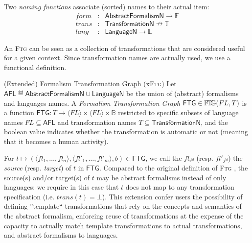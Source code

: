 \begin{Definition}
   Two \emph{naming functions} associate (sorted) names to their actual item:
   \begin{displaymath}
      \begin{array}{rcl}
         form  &\colon& \mathsf{AbstractFormalismN} \to \mathbb{F}\\
         trans &\colon& \mathsf{TransformationN} \nrightarrow \mathbb{T}\\
         lang  &\colon& \mathsf{LanguageN} \to \mathbb{L}
      \end{array}
   \end{displaymath}
\end{Definition}

An \textsc{Ftg} can be seen as a collection of transformations that are 
considered useful for a given context. Since transformation names are actually 
used, we use a functional definition.
\begin{Definition}{(Extended) Formalism Transformation Graph (x\textsc{Ftg})}
   Let $\mathsf{AFL} \eqdef \mathsf{AbstractFormalismN} \cup 
\mathsf{LanguageN}$ be the union of (abstract) formalisms and languages names. A 
\emph{Formalism Transformation Graph} $\mathsf{FTG} \in \mathbb{F}\!\mathbb{T}\!\mathbb{G}(FL, T)$ is a 
function  $\mathsf{FTG} \colon T \to \langle FL \rangle \times \langle FL 
\rangle \times \mathbb{B}$ restricted to specific subsets of language names $FL 
\subseteq \mathsf{AFL}$ and transformation names $T\subseteq 
\mathsf{TransformationN}$, and the boolean value indicates whether the 
transformation is automatic or not (meaning that it becomes a human activity).
\end{Definition}
\noindent
For $t \mapsto (\langle fl_1, \ldots, fl_n \rangle, \langle fl'_1, \ldots, 
fl'_m \rangle, b)\in \mathsf{FTG}$, we call the $fl_i$s (resp. $fl'_j$s) the 
\emph{source} (resp. \emph{target}) of $t$ in $\mathsf{FTG}$. 
Compared to the original definition of \textsc{Ftg} 
\cite{Mustafiz-etAl:2012,TR:Lucio-Mustafiz-etAl:2012}, the source(s) and/or 
target(s) of $t$ may be abstract formalisms instead of only languages: we 
require in this case that $t$ does not map to any transformation specification 
(i.e. $trans(t) = \bot$). This extension confer users the possibility of 
defining ''template`` transformations that rely on the concepts and semantics 
of the abstract formalism, enforcing reuse of transformations at the expense of 
the capacity to actually match template transformations to actual 
transformations, and abstract formalisms to languages. 

